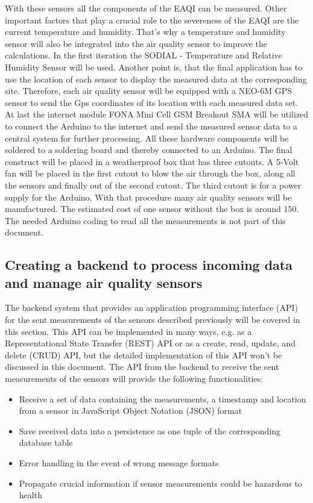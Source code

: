 \documentclass[conference]{IEEEtran}
\begin{document}
With these sensors all the components of the EAQI can be measured. Other important factors that play a crucial role to the severeness of the EAQI are the current temperature and humidity. That’s why a temperature and humidity sensor will also be integrated into the air quality sensor to improve the calculations. In the first iteration the SODIAL - Temperature and Relative Humidity Sensor will be used. Another point is, that the final application has to use the location of each sensor to display the measured data at the corresponding site. Therefore, each air quality sensor will be equipped with a NEO-6M GPS sensor to send the Gps coordinates of its location with each measured data set. At last the internet module FONA Mini Cell GSM Breakout SMA will be utilized to connect the Arduino to the internet and send the measured sensor data to a central system for further processing. All these hardware components will be soldered to a soldering board and thereby connected to an Arduino. The final construct will be placed in a weatherproof box that has three cutouts. A 5-Volt fan will be placed in the first cutout to blow the air through the box, along all the sensors and finally out of the second cutout. The third cutout is for a power supply for the Arduino. With that procedure many air quality sensors will be manufactured. The estimated cost of one sensor without the box is around 150. The needed Arduino coding to read all the measurements is not part of this document.

\subsection{Creating a backend to process incoming data and manage air quality sensors}
The backend system that provides an application programming interface (API) for the sent measurements of the sensors described previously will be covered in this section. This API can be implemented in many ways, e.g. as a Representational State Transfer (REST) API or as a create, read, update, and delete (CRUD) API, but the detailed implementation of this API won’t be discussed in this document. The API from the backend to receive the sent measurements of the sensors will provide the following functionalities:
\begin{itemize}
\item Receive a set of data containing the measurements, a timestamp and location from a sensor in JavaScript Object Notation (JSON) format
\item Save received data into a persistence as one tuple of the corresponding database table
\item Error handling in the event of wrong message formats
\item  Propagate crucial information if sensor measurements could be hazardous to health
\end{itemize}
\end{document}
